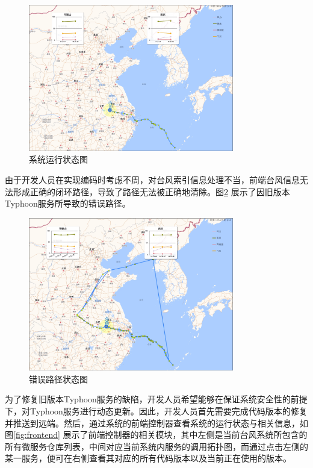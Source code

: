 \documentclass[macfonts,master]{njuthesis}
\begin{document}
\begin{figure}[!htbp]
  \centering
  \includegraphics[width= 0.8\textwidth]{image/running_v1.png}
  \caption{系统运行状态图}
  \label{fig:running_v1}
\end{figure}

由于开发人员在实现编码时考虑不周，对台风索引信息处理不当，前端台风信息无法形成正确的闭环路径，导致了路径无法被正确地清除。图\ref{fig:running_error} 展示了因旧版本Typhoon服务所导致的错误路径。

\begin{figure}[!htbp]
  \centering
  \includegraphics[width= 0.8\textwidth]{image/running_error.png}
  \caption{错误路径状态图}
  \label{fig:running_error}
\end{figure}

为了修复旧版本Typhoon服务的缺陷，开发人员希望能够在保证系统安全性的前提下，对Typhoon服务进行动态更新。因此，开发人员首先需要完成代码版本的修复并推送到远端。然后，通过系统的前端控制器查看系统的运行状态与相关信息，如图\ref{fig:frontend} 展示了前端控制器的相关模块，其中左侧是当前台风系统所包含的所有微服务仓库列表，中间对应当前系统内服务的调用拓扑图，而通过点击左侧的某一服务，便可在右侧查看其对应的所有代码版本以及当前正在使用的版本。
\end{document}
